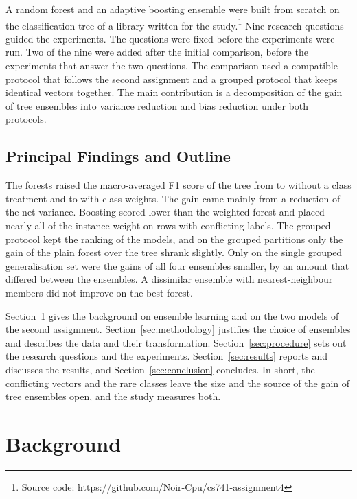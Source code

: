 \documentclass[10pt,conference]{IEEEtran}
\begin{document}
A random forest and an adaptive boosting ensemble were built from scratch on the classification tree of a library written for the study.\footnote{Source code: https://github.com/Noir-Cpu/cs741-assignment4} Nine research questions guided the experiments. The questions were fixed before the experiments were run. Two of the nine were added after the initial comparison, before the experiments that answer the two questions. The comparison used a compatible protocol that follows the second assignment and a grouped protocol that keeps identical vectors together. The main contribution is a decomposition of the gain of tree ensembles into variance reduction and bias reduction under both protocols.

\subsection{Principal Findings and Outline}
\label{sec:intro-summary}

The forests raised the macro-averaged F1 score of the tree from \OPCompTreeMacroF{} to \OPCompRfMacroF{} without a class treatment and to \OPCompRfWMacroF{} with class weights. The gain came mainly from a reduction of the net variance. Boosting scored lower than the weighted forest and placed nearly all of the instance weight on rows with conflicting labels. The grouped protocol kept the ranking of the models, and on the grouped partitions only the gain of the plain forest over the tree shrank slightly. Only on the single grouped generalisation set were the gains of all four ensembles smaller, by an amount that differed between the ensembles. A dissimilar ensemble with nearest-neighbour members did not improve on the best forest.

Section~\ref{sec:background} gives the background on ensemble learning and on the two models of the second assignment. Section~\ref{sec:methodology} justifies the choice of ensembles and describes the data and their transformation. Section~\ref{sec:procedure} sets out the research questions and the experiments. Section~\ref{sec:results} reports and discusses the results, and Section~\ref{sec:conclusion} concludes. In short, the conflicting vectors and the rare classes leave the size and the source of the gain of tree ensembles open, and the study measures both.

\section{Background}
\label{sec:background}
\end{document}
